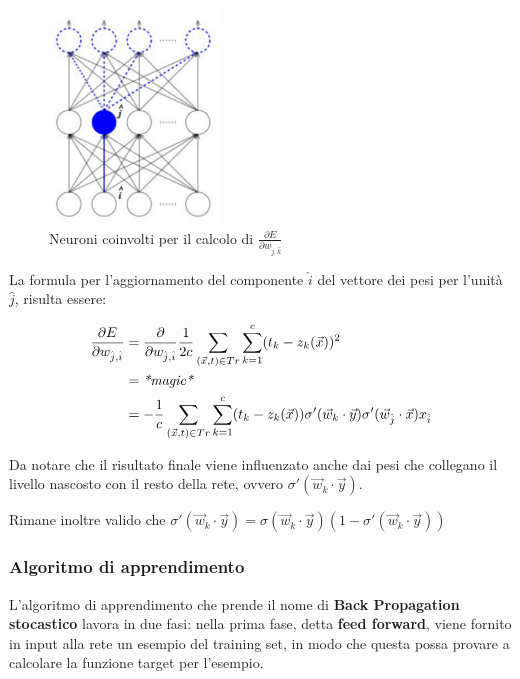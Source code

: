 \begin{figure}[htbp]
\centering
\includegraphics[width=0.4\textwidth]{./notes/immagini/l10-wji.png}
\caption{Neuroni coinvolti per il calcolo di $\frac{\partial E}{\partial w_{\hat{j},\hat{k}}}$}
\end{figure}

La formula per l'aggiornamento del componente $\hat{i}$ del vettore dei pesi per l'unità $\hat{j}$, risulta essere:

\begin{align*}
\frac{\partial E}{\partial w_{\hat{j},\hat{i}}} &= \frac{\partial}{\partial w_{\hat{j},\hat{i}}} \frac{1}{2c} \sum_{(\vec{x},t) \in Tr} \sum\limits_{k=1}^c (t_k - z_k(\vec{x}))^2 \\
 &= \text{\textit{*magic*}} \\
 &= - \frac{1}{c} \sum_{(\vec{x},t) \in Tr} \sum\limits_{k=1}^c (t_{k} - z_{k}(\vec{x}))  \sigma ' (\vec{w}_{k}  \cdot \vec{y}) \sigma ' (\vec{w}_{\hat{j}}  \cdot \vec{x}) x_{\hat{i}}
\end{align*}

Da notare che il risultato finale viene influenzato anche dai pesi che collegano il livello nascosto con il resto della rete, ovvero $\sigma ' (\vec{w}_{k}  \cdot \vec{y}) $.

Rimane inoltre valido che $\sigma ' (\vec{w}_{k}  \cdot \vec{y}) = \sigma  (\vec{w}_{k}  \cdot \vec{y}) (1 - \sigma ' (\vec{w}_{k}  \cdot \vec{y}))$

\subsubsection{Algoritmo di apprendimento}\label{algoritmo-di-apprendimento-1}

L'algoritmo di apprendimento che prende il nome di \textbf{Back Propagation stocastico} lavora in due fasi: nella prima fase, detta
\textbf{feed forward}, viene fornito in input alla rete un esempio del
training set, in modo che questa possa provare a calcolare la funzione
target per l'esempio. 

